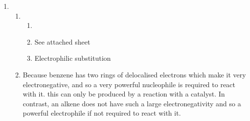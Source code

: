 \documentclass{article}
\begin{document}
\begin{enumerate}
\begin{enumerate}
\end{enumerate}

\item \begin{enumerate}
\item \begin{enumerate}
\item {}
\item See attached sheet\\

\item Electrophilic substitution\\

\end{enumerate}

\item Because benzene has two rings of delocalised electrons which make it very electronegative, and so a very powerful nucleophile is required to react with it. this can only be produced by a reaction with a catalyst. In contrast, an alkene does not have such a large electronegativity and so a powerful electrophile if not required to react with it.\\

\end{enumerate}

\end{enumerate}
\end{document}
